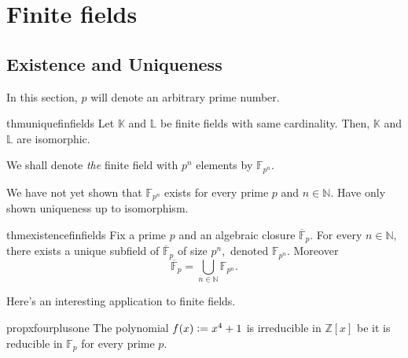 \chapter{Finite fields}

\section{Existence and Uniqueness}

In this section, $p$ will denote an arbitrary prime number.

\begin{restatable}{thm}{uniquefinfields}
\label{thm:uniquefinfields}
    Let $\mathbb{K}$ and $\mathbb{L}$ be finite fields with same cardinality. Then, $\mathbb{K}$ and $\mathbb{L}$ are isomorphic. \hfill\hyperref[thm:uniquefinfields2]{\downsym}
\end{restatable}

\begin{defn}%
    We shall denote \emph{the} finite field with $p^n$ elements by $\mathbb{F}_{p^n}.$
\end{defn}

\begin{rem}
    We have not yet shown that $\mathbb{F}_{p^n}$ exists for every prime $p$ and $n \in \mathbb{N}.$ Have only shown uniqueness up to isomorphism.
\end{rem}

\begin{restatable}{thm}{existencefinfields}
\label{thm:existencefinfields}
    Fix a prime $p$ and an algebraic closure $\overline{\mathbb{F}}_p.$ For every $n \in \mathbb{N},$ there exists a unique subfield of $\overline{\mathbb{F}}_p$ of size $p^n,$ denoted $\mathbb{F}_{p^n}.$ Moreover
    \begin{equation*} 
        \overline{\mathbb{F}}_p = \bigcup_{n \in \mathbb{N}} \mathbb{F}_{p^n}.
    \end{equation*}
    \hfill\hyperref[thm:existencefinfields2]{\downsym}
\end{restatable}

Here's an interesting application to finite fields.

\begin{restatable}[]{prop}{xfourplusone}
\label{prop:xfourplusone}
    The polynomial $f(x) \vcentcolon= x^4 + 1$ is irreducible in $\mathbb{Z}[x]$ be it is reducible in $\mathbb{F}_p$ for every prime $p.$ \hfill\hyperref[prop:xfourplusone2]{\downsym}
\end{restatable}

